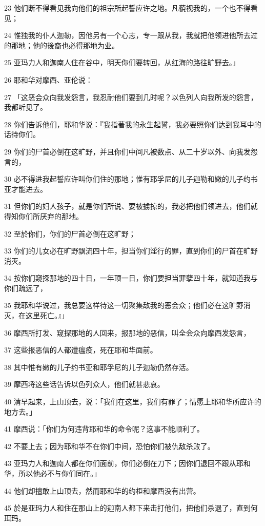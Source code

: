 \par 23 他们断不得看见我向他们的祖宗所起誓应许之地。凡藐视我的，一个也不得看见；
\par 24 惟独我的仆人迦勒，因他另有一个心志，专一跟从我，我就把他领进他所去过的那地；他的後裔也必得那地为业。
\par 25 亚玛力人和迦南人住在谷中，明天你们要转回，从红海的路往旷野去。」
\par 26 耶和华对摩西、亚伦说：
\par 27 「这恶会众向我发怨言，我忍耐他们要到几时呢？以色列人向我所发的怨言，我都听见了。
\par 28 你们告诉他们，耶和华说：『我指著我的永生起誓，我必要照你们达到我耳中的话待你们。
\par 29 你们的尸首必倒在这旷野，并且你们中间凡被数点、从二十岁以外、向我发怨言的，
\par 30 必不得进我起誓应许叫你们住的那地；惟有耶孚尼的儿子迦勒和嫩的儿子约书亚才能进去。
\par 31 但你们的妇人孩子，就是你们所说、要被掳掠的，我必把他们领进去，他们就得知你们所厌弃的那地。
\par 32 至於你们，你们的尸首必倒在这旷野；
\par 33 你们的儿女必在旷野飘流四十年，担当你们淫行的罪，直到你们的尸首在旷野消灭。
\par 34 按你们窥探那地的四十日，一年顶一日，你们要担当罪孽四十年，就知道我与你们疏远了，
\par 35 我耶和华说过，我总要这样待这一切聚集敌我的恶会众；他们必在这旷野消灭，在这里死亡。』」
\par 36 摩西所打发、窥探那地的人回来，报那地的恶信，叫全会众向摩西发怨言，
\par 37 这些报恶信的人都遭瘟疫，死在耶和华面前。
\par 38 其中惟有嫩的儿子约书亚和耶孚尼的儿子迦勒仍然存活。
\par 39 摩西将这些话告诉以色列众人，他们就甚悲哀。
\par 40 清早起来，上山顶去，说：「我们在这里，我们有罪了；情愿上耶和华所应许的地方去。」
\par 41 摩西说：「你们为何违背耶和华的命令呢？这事不能顺利了。
\par 42 不要上去；因为耶和华不在你们中间，恐怕你们被仇敌杀败了。
\par 43 亚玛力人和迦南人都在你们面前，你们必倒在刀下；因你们退回不跟从耶和华，所以他必不与你们同在。」
\par 44 他们却擅敢上山顶去，然而耶和华的约柜和摩西没有出营。
\par 45 於是亚玛力人和住在那山上的迦南人都下来击打他们，把他们杀退了，直到何珥玛。


